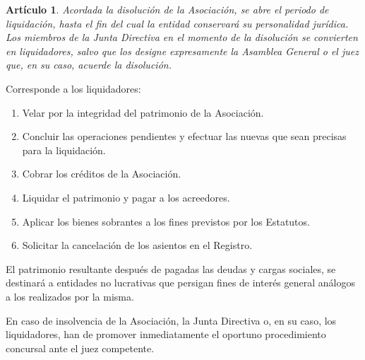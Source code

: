 \documentclass[a4paper,12pt]{article}
\theoremstyle{mystyle}		%
\newtheorem{art}{Artículo}	%
\begin{document}
\begin{onehalfspace}
\begin{art}
Acordada la disolución de la Asociación, se abre el periodo de liquidación, hasta el fin del cual la entidad conservará su personalidad jurídica. Los miembros de la Junta Directiva en el momento de la disolución se convierten en liquidadores, salvo que los designe expresamente la Asamblea General o el juez que, en su caso, acuerde la disolución.
\end{art}

Corresponde a los liquidadores:
\begin{enumerate}[label={\alph*)}]
 \item Velar por la integridad del patrimonio de la Asociación.
 \item Concluir las operaciones pendientes y efectuar las nuevas que sean precisas para la liquidación.
 \item Cobrar los créditos de la Asociación.
 \item Liquidar el patrimonio y pagar a los acreedores.
 \item Aplicar los bienes sobrantes a los fines previstos por los Estatutos.
 \item Solicitar la cancelación de los asientos en el Registro.
\end{enumerate}

El patrimonio resultante después de pagadas las deudas y cargas sociales, se destinará a entidades no lucrativas que persigan fines de interés general análogos a los realizados por la misma.

En caso de insolvencia de la Asociación, la Junta Directiva o, en su caso, los liquidadores, han de promover inmediatamente el oportuno procedimiento concursal ante el juez competente.

\end{onehalfspace}
\end{document}

